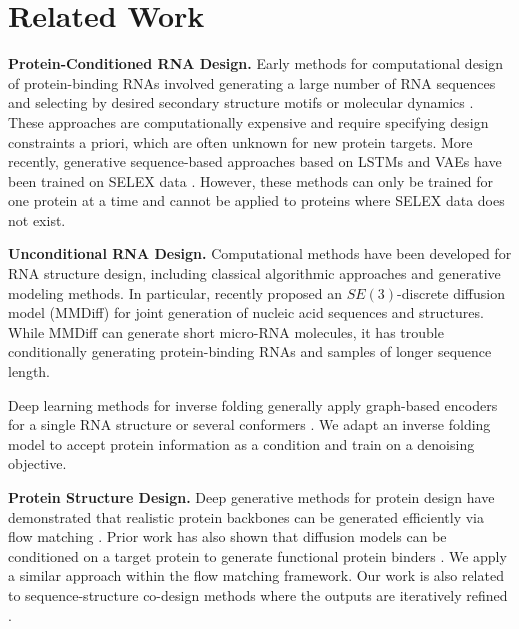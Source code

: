 \section{Related Work}

\textbf{Protein-Conditioned RNA Design.} Early methods for computational design of protein-binding RNAs involved generating a large number of RNA sequences and selecting by desired secondary structure motifs \cite{kim2010computational} or molecular dynamics \cite{zhou2015searching, buglak2020methods}. These approaches are computationally expensive and require specifying design constraints a priori, which are often unknown for new protein targets. More recently, generative sequence-based approaches based on LSTMs and VAEs have been trained on SELEX data \cite{im2019generative, iwano2022generative}. However, these methods can only be trained for one protein at a time and cannot be applied to proteins where SELEX data does not exist.

\textbf{Unconditional RNA Design.} Computational methods have been developed for RNA structure design, including classical algorithmic approaches \cite{yesselman2019computational} and generative modeling methods. In particular, \citet{morehead2023towards} recently proposed an $SE(3)$-discrete diffusion model (MMDiff) for joint generation of nucleic acid sequences and structures. While MMDiff can generate short micro-RNA molecules, it has trouble conditionally generating protein-binding RNAs and samples of longer sequence length.

Deep learning methods for inverse folding generally apply graph-based encoders for a single RNA structure \cite{tan2023hierarchical} or several conformers \cite{joshi2023multi}. We adapt an inverse folding model to accept protein information as a condition and train on a denoising objective.



\textbf{Protein Structure Design.} Deep generative methods for protein design have demonstrated that realistic protein backbones can be generated efficiently via flow matching \cite{yim2023fast, bose2023se}. Prior work has also shown that diffusion models can be conditioned on a target protein to generate functional protein binders \cite{ingraham2023illuminating, watson2023novo}. We apply a similar approach within the flow matching framework. Our work is also related to sequence-structure co-design methods where the outputs are iteratively refined \cite{jin2021iterative, stark2023harmonic}.
